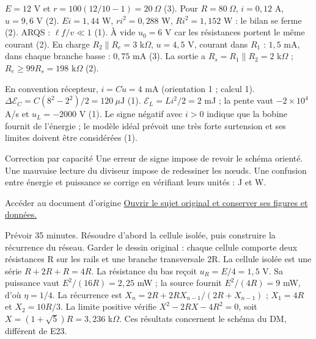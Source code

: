 $E=12$ V et $r=100(12/10-1)=20\ \Omega$ (3). Pour $R=80\ \Omega$, $i=0{,}12$ A, $u=9{,}6$ V (2). $Ei=1{,}44$ W, $ri^2=0{,}288$ W, $Ri^2=1{,}152$ W : le bilan se ferme (2). ARQS : $\ell f/v\ll1$ (1).
À vide $u_0=6$ V car les résistances portent le même courant (2). En charge $R_2\parallel R_e=3$ k$\Omega$, $u=4{,}5$ V, courant dans $R_1$ : $1{,}5$ mA, dans chaque branche basse : $0{,}75$ mA (3). La sortie a $R_s=R_1\parallel R_2=2$ k$\Omega$ ; $R_e\geq99R_s=198$ k$\Omega$ (2).


En convention récepteur, $i=C\dot u=4$ mA (orientation 1 ; calcul 1). $\Delta\mathcal E_C=C(8^2-2^2)/2=120\ \mu\mathrm{ J}$ (1). $\mathcal E_L=Li^2/2=2$ mJ ; la pente vaut $-2\times10^4$ A/s et $u_L=-2000$ V (1). Le signe négatif avec $i>0$ indique que la bobine fournit de l’énergie ; le modèle idéal prévoit une très forte surtension et ses limites doivent être considérées (1).
\begin{methode}{Correction par capacité}
Une erreur de signe impose de revoir le schéma orienté. Une mauvaise lecture du diviseur impose de redessiner les nœuds. Une confusion entre énergie et puissance se corrige en vérifiant leurs unités : J et W.
\end{methode}


\begin{loi}{Accéder au document d’origine}
\href{https://mpsi.schleck.ovh/fichiers/devoirs/dm2_optique_elec.pdf}{Ouvrir le sujet original et conserver ses figures et données.}
\end{loi}
Prévoir 35 minutes. Résoudre d’abord la cellule isolée, puis construire la récurrence du réseau. Garder le dessin original : chaque cellule comporte deux résistances R sur les rails et une branche transversale 2R.
La cellule isolée est une série $R+2R+R=4R$. La résistance du bas reçoit $u_R=E/4=1{,}5$ V. Sa puissance vaut $E^2/(16R)=2{,}25$ mW ; la source fournit $E^2/(4R)=9$ mW, d’où $\eta=1/4$. La récurrence est $X_n=2R+2RX_{n-1}/(2R+X_{n-1})$ ; $X_1=4R$ et $X_2=10R/3$. La limite positive vérifie $X^2-2RX-4R^2=0$, soit $X=(1+\sqrt5)R=3{,}236$ k$\Omega$. Ces résultats concernent le schéma du DM, différent de E23.

